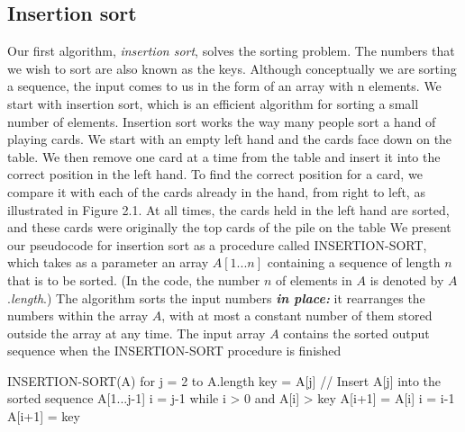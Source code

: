 \documentclass{report}
\begin{document}
    \subsection{Insertion sort}
    \bigbreak \noindent 
    Our first algorithm, \textit{insertion sort}, solves the sorting problem. The numbers that we wish to sort are also known as the keys. Although conceptually we are sorting a sequence, the input comes to us in the form of an array with n elements.
    \bigbreak \noindent 
    We start with insertion sort, which is an efficient algorithm for sorting a small number of elements. Insertion sort works the way many people sort a hand of playing cards. We start with an empty left hand and the cards face down on the table. We then remove one card at a time from the table and insert it into the correct position in the left hand. To find the correct position for a card, we compare it with each of the cards already in the hand, from right to left, as illustrated in Figure 2.1. At all times, the cards held in the left hand are sorted, and these cards were originally the top cards of the pile on the table
    \bigbreak \noindent 
    We present our pseudocode for insertion sort as a procedure called INSERTION-SORT, which takes as a parameter an array $A[1...n]$ containing a sequence of length $n$ that is to be sorted. (In the code, the number $n$ of elements in $A$ is denoted by $A$.\textit{length}.) The algorithm sorts the input numbers \textbf{\textit{in place:}} it rearranges the numbers within the array $A$, with at most a constant number of them stored outside the array at any time. The input array $A$ contains the sorted output sequence when the INSERTION-SORT procedure is finished
    \bigbreak \noindent 
    \bigbreak \noindent 
    \begin{cppcode}
    INSERTION-SORT(A)
        for j = 2 to A.length
            key = A[j]
            // Insert A[j] into the sorted sequence A[1...j-1]
            i = j-1
            while i > 0 and A[i] > key
                A[i+1] = A[i]
                i = i-1
            A[i+1] = key
    \end{cppcode}

    \pagebreak 
\end{document}
